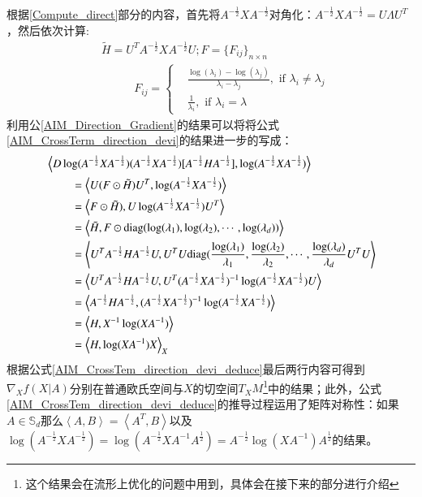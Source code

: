 根据\ref{Compute_direct}部分的内容，首先将$A^{-\frac{1}{2}}XA^{-\frac{1}{2}}$对角化：$A^{-\frac{1}{2}}XA^{-\frac{1}{2}}=U\Lambda U^{T}$，然后依次计算:
\begin{equation}
\label{AIM_Direction_Gradient}
\begin{split}
&\tilde{H}=U^{T}A^{-\frac{1}{2}}XA^{-\frac{1}{2}}U;F=\{F_{ij}\}_{n \times n}\\
&~~~~~~~~~~~~~F_{ij}=\left\{
\begin{split}
&\frac{\log(\lambda_{i})-\log(\lambda_{j})}{\lambda_{i}-\lambda_{j}},\text{ if $\lambda_i \neq \lambda_j$}\\
&\frac{1}{\lambda_i},\text{ if $\lambda_i=\lambda$}
\end{split}
\right.
\end{split}
\end{equation}
利用公\ref{AIM_Direction_Gradient}的结果可以将将公式\ref{AIM_CrossTerm_direction_devi}的结果进一步的写成：
\begin{equation}
\label{AIM_CrossTem_direction_devi_deduce}
\begin{split}
&\left<D\log(A^{-\frac{1}{2}}XA^{-\frac{1}{2}})(A^{-\frac{1}{2}}XA^{-\frac{1}{2}})[A^{-\frac{1}{2}}HA^{-\frac{1}{2}}],\log(A^{-\frac{1}{2}}XA^{-\frac{1}{2}})\right>\\
&~~~~~~~~~=\left<U(F\odot\tilde{H})U^{T},\log(A^{-\frac{1}{2}}XA^{-\frac{1}{2}})\right>\\
&~~~~~~~~~=\left<F\odot\tilde{H}),U\log(A^{-\frac{1}{2}}XA^{-\frac{1}{2}})U^{T}\right>\\
&~~~~~~~~~=\left<\tilde{H},F\odot{\rm diag}(\log(\lambda_1),\log(\lambda_2),\cdots,\log(\lambda_d))\right>\\
&~~~~~~~~~=\left<U^{T}A^{-\frac{1}{2}}HA^{-\frac{1}{2}}U,U^{T}U{\rm diag}(\frac{\log(\lambda_1)}{\lambda_1},\frac{\log(\lambda_2)}{\lambda_2},\cdots,\frac{\log(\lambda_d)}{\lambda_d}U^{T}U\right>\\
&~~~~~~~~~=\left<U^{T}A^{-\frac{1}{2}}HA^{-\frac{1}{2}}U,U^{T}(A^{-\frac{1}{2}}XA^{-\frac{1}{2}})^{-1}\log(A^{-\frac{1}{2}}XA^{-\frac{1}{2}})U\right>\\
&~~~~~~~~~=\left<A^{-\frac{1}{2}}HA^{-\frac{1}{2}},(A^{-\frac{1}{2}}XA^{-\frac{1}{2}})^{-1}\log(A^{-\frac{1}{2}}XA^{-\frac{1}{2}})\right>\\
&~~~~~~~~~=\left<H,X^{-1}\log(XA^{-1})\right>\\
&~~~~~~~~~=\left<H,\log(XA^{-1})X\right>_X\\
\end{split}
\end{equation}
根据公式\ref{AIM_CrossTem_direction_devi_deduce}最后两行内容可得到$\nabla_X f(X|A)$分别在普通欧氏空间与$X$的切空间$T_XM$\footnote{这个结果会在流形上优化的问题中用到，具体会在接下来的部分进行介绍}中的结果；此外，公式\ref{AIM_CrossTem_direction_devi_deduce}的推导过程运用了矩阵对称性：如果$A \in \mathbb{S}_{d}$那么$\left<A,B\right>=\left<A^{T},B\right>$以及$\log(A^{-\frac{1}{2}}XA^{-\frac{1}{2}})=\log(A^{-\frac{1}{2}}XA^{-1}A^{\frac{1}{2}})=A^{-\frac{1}{2}}\log(XA^{-1})A^{\frac{1}{2}}$的结果。
